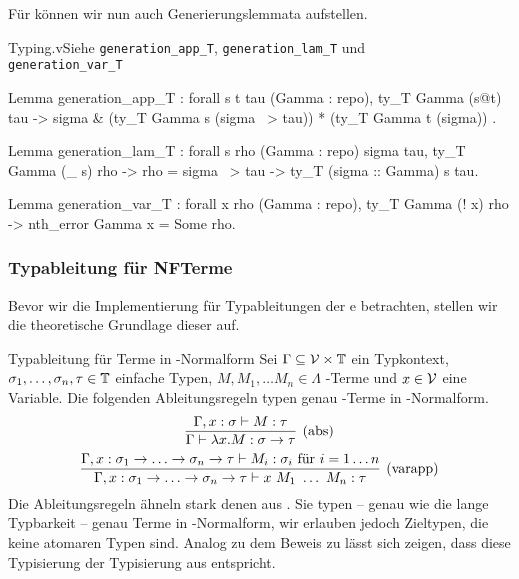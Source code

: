 Für  können wir nun auch Generierungslemmata aufstellen.
\begin{multicode}[simplgen]{Typing.v}{Siehe }{\texttt{generation\_app\_T}, \texttt{generation\_lam\_T} und \\\texttt{generation\_var\_T}}
        \begin{mcode}{40}
Lemma generation_app_T : forall s t tau (Gamma : repo), ty_T Gamma (s@t) tau ->
    {sigma & (ty_T Gamma s (sigma ~> tau)) * (ty_T Gamma t (sigma)) }.
        \end{mcode}
        \begin{mcode}{50}
Lemma generation_lam_T : forall s rho (Gamma : repo) sigma tau, 
    ty_T Gamma (\_ s) rho -> rho = sigma ~> tau -> ty_T (sigma :: Gamma) s tau.
        \end{mcode}                
    \begin{mcode}{58}
Lemma generation_var_T : forall x rho (Gamma : repo), ty_T Gamma (! x) rho ->
    nth_error Gamma x = Some rho.        
    \end{mcode}
\end{multicode}

\subsubsection{Typableitung für NFTerme}
Bevor wir die Implementierung für Typableitungen der e betrachten, stellen wir die theoretische Grundlage dieser auf.

\begin{lemma}{Typableitung für Terme in \tbeta-Normalform}{}
Sei $\Gamma\subseteq\mathcal{V}\times\mathbb{T}$ ein Typkontext, $\sigma_1,\ldots,\sigma_n,\tau\in\mathbb{T}$ einfache Typen, $M, M_1,\ldots M_n\in\Lambda$ \tlambda-Terme und $x\in\mathcal{V}$ eine Variable. Die folgenden Ableitungsregeln typen genau \tlambda-Terme in \tbeta-Normalform.
  \[\infer[\abs]{\Gamma\vdash\lambda x.M : \sigma\to\tau}{\Gamma, x:\sigma\vdash M:\tau}\]    
\[\infer[\varapp]{\Gamma,x:\sigma_1\to\ldots\to\sigma_n\to \tau\vdash x~M_1~\ldots~M_n:\tau}{\Gamma,x:\sigma_1\to\ldots\to\sigma_n\to \tau\vdash M_i : \sigma_i \text{ für } i=1\ldots n}\] 
\Proofidea
Die Ableitungsregeln ähneln stark denen aus . Sie typen -- genau wie die lange Typbarkeit -- genau Terme in \tbeta-Normalform, wir erlauben jedoch Zieltypen, die keine atomaren Typen sind. Analog zu dem Beweis zu  lässt sich zeigen, dass diese Typisierung der Typisierung aus  entspricht.
\end{lemma}

